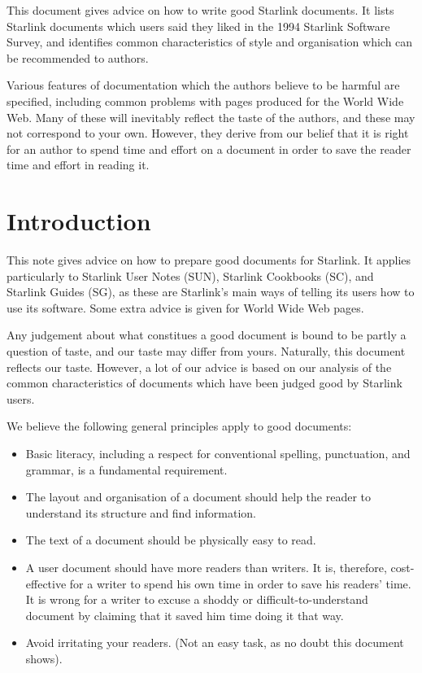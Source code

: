 \documentclass[twoside,11pt]{article}
\newcommand{\stardocinitials}  {SGP}
\newcommand{\stardocnumber}    {28.8}
\newcommand{\stardocabstract}  {
  This document gives advice on how to write good Starlink documents.
  It lists Starlink documents which users said they liked in the 1994
  Starlink Software Survey, and identifies common characteristics of style
  and organisation which can be recommended to authors.

  Various features of documentation which the authors believe to be harmful
  are specified, including common problems with pages produced for
  the World Wide Web.
  Many of these will inevitably reflect the taste of the authors, and these
  may not correspond to your own.
  However, they derive from our belief that it is right for an author
  to spend time and effort on a document in order to save the reader time
  and effort in reading it.
}
\newcommand{\stardocname}{\stardocinitials /\stardocnumber}
\newenvironment{latexonly}{}{}
\newcommand{\latexonlytoc}[0]{\tableofcontents}
\renewcommand{\thepage}{\roman{page}}
\begin{document}
\stardocabstract
\newpage
\begin{latexonly}
   \setlength{\parskip}{0mm}
   \latexonlytoc
   \setlength{\parskip}{\medskipamount}
   \markright{\stardocname}
\end{latexonly}
\newpage
\renewcommand{\thepage}{\arabic{page}}
\setcounter{page}{1}

\section{Introduction}

This note gives advice on how to prepare good documents for Starlink.
It applies particularly to Starlink User Notes (SUN), Starlink Cookbooks (SC),
and Starlink Guides (SG), as these are Starlink's main ways of telling its users
how to use its software.
Some extra advice is given for World Wide Web pages.

Any judgement about what constitues a good document is bound to be partly a
question of taste, and our taste may differ from yours.
Naturally, this document reflects our taste.
However, a lot of our advice is based on our analysis of the common
characteristics of documents which have been judged good by Starlink users.

We believe the following general principles apply to good documents:

\begin{itemize}
\item Basic literacy, including a respect for conventional spelling,
punctuation, and grammar, is a fundamental requirement.
\item The layout and organisation of a document should help the reader to
understand its structure and find information.
\item The text of a document should be physically easy to read.
\item A user document should have more readers than writers.
It is, therefore, cost-effective for a writer to spend his own time in order
to save his readers' time.
It is wrong for a writer to excuse a shoddy or difficult-to-understand document
by claiming that it saved him time doing it that way.
\item Avoid irritating your readers.
(Not an easy task, as no doubt this document shows).
\end{itemize}
\end{document}
